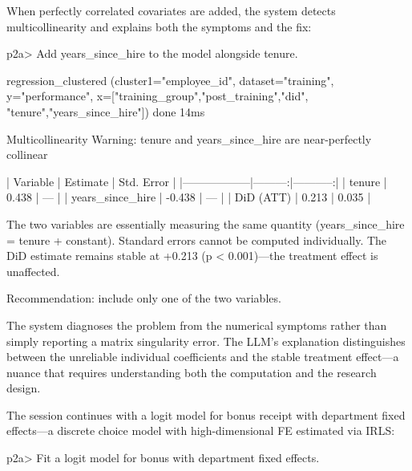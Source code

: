 When perfectly correlated covariates are added, the system detects
multicollinearity and explains both the symptoms and the fix:

\begin{Sinput}
p2a> Add years_since_hire to the model alongside tenure.
\end{Sinput}

\begin{Soutput}
  [tool] regression_clustered (cluster1="employee_id",
           dataset="training", y="performance",
           x=["training_group","post_training","did",
               "tenure","years_since_hire"])                         done 14ms

Multicollinearity Warning: tenure and years_since_hire are
near-perfectly collinear

| Variable         | Estimate | Std. Error |
|------------------|---------:|-----------:|
| tenure           |    0.438 |        --- |
| years_since_hire |   -0.438 |        --- |
| DiD (ATT)        |    0.213 |      0.035 |

The two variables are essentially measuring the same quantity
(years_since_hire = tenure + constant). Standard errors cannot be
computed individually. The DiD estimate remains stable at +0.213
(p < 0.001)---the treatment effect is unaffected.

Recommendation: include only one of the two variables.
\end{Soutput}

\noindent The system diagnoses the problem from the numerical symptoms
rather than simply reporting a matrix singularity error. The LLM's
explanation distinguishes between the unreliable individual coefficients
and the stable treatment effect---a nuance that requires understanding
both the computation and the research design.

The session continues with a logit model for bonus receipt with
department fixed effects---a discrete choice model with high-dimensional
FE estimated via IRLS:

\begin{Sinput}
p2a> Fit a logit model for bonus with department fixed effects.
\end{Sinput}

